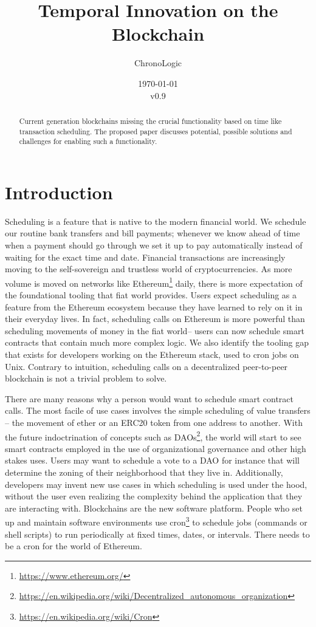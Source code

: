 \documentclass{report}
\title{Temporal Innovation on the Blockchain}
\author{ChronoLogic}
\date{\today\\v0.9}
\begin{document}
  \maketitle
  \begin{abstract}
    Current generation blockchains missing the crucial functionality based on time like transaction scheduling. The proposed paper discusses potential, possible solutions and challenges for enabling such a functionality. 
  \end{abstract}
  \newpage
  \tableofcontents
  \newpage
  \chapter{Introduction}
  Scheduling is a feature that is native to the modern financial world. 
  We schedule our routine bank transfers and bill payments; whenever we know ahead of time when a payment should go through we set it up to pay automatically instead of waiting for the exact time and date. Financial transactions are increasingly moving to the self-sovereign and trustless world of cryptocurrencies. As more volume is moved on networks like Ethereum\footnote{\url{https://www.ethereum.org/}} daily, there is more expectation of the foundational tooling that fiat world provides. Users expect scheduling as a feature from the Ethereum ecosystem because they have learned to rely on it in their everyday lives. In fact, scheduling calls on Ethereum is more powerful than scheduling movements of money in the fiat world-- users can now schedule smart contracts that contain much more complex logic. We also identify the tooling gap that exists for developers working on the Ethereum stack, used to cron jobs on Unix. Contrary to intuition, scheduling calls on a decentralized peer-to-peer blockchain is not a trivial problem to solve.
  
  There are many reasons why a person would want to schedule smart contract calls. The most facile of use cases involves the simple scheduling of value transfers -- the movement of ether or an ERC20 token from one address to another. With the future indoctrination of concepts such as DAOs\footnote{\url{https://en.wikipedia.org/wiki/Decentralized_autonomous_organization}}, the world will start to see smart contracts employed in the use of organizational governance and other high stakes uses. Users may want to schedule a vote to a DAO for instance that will determine the zoning of their neighborhood that they live in. Additionally, developers may invent new use cases in which scheduling is used under the hood, without the user even realizing the complexity behind the application that they are interacting with. Blockchains are the new software platform. People who set up and maintain software environments use cron\footnote{\url{https://en.wikipedia.org/wiki/Cron}} to schedule jobs (commands or shell scripts) to run periodically at fixed times, dates, or intervals. There needs to be a cron for the world of Ethereum.
\end{document}
